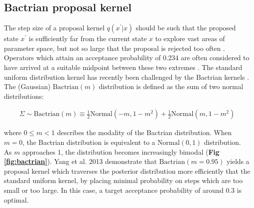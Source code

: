 \documentclass[10pt,letterpaper]{article}
\begin{document}
\clearpage
\subsection*{Bactrian proposal kernel} \label{sect:randomwalks}



The step size of a proposal kernel $q(x^\prime|x)$ should be such that the proposed state $x^\prime$ is sufficiently far from the current state $x$ to explore vast areas of parameter space, but not so large that the proposal is rejected too often \cite{roberts1997weak}. 
Operators which attain an acceptance probability of 0.234 are often considered to have arrived at a suitable midpoint between these two extremes \cite{bouckaert2019beast, roberts1997weak}.
The standard uniform distribution kernel has recently been challenged by the Bactrian kernels \cite{yang2013searching, thawornwattana2018designing}.
The (Gaussian) $\text{Bactrian}(m)$ distribution is defined as the sum of two normal distributions:


\begin{align}
	\Sigma \sim \text{Bactrian}(m) \equiv \frac{1}{2}\text{Normal}(-m, 1-m^2) + \frac{1}{2}\text{Normal}(m, 1-m^2)
\end{align}


\noindent
where $0 \leq m < 1$ describes the modality of the Bactrian distribution. When $m=0$, the Bactrian distribution is equivalent to a $\text{Normal}(0, 1)$ distribution. 
As $m$ approaches 1, the distribution becomes increasingly bimodal (\textbf{Fig \ref{fig:bactrian}}). 
Yang et al. 2013 \cite{yang2013searching} demonstrate that $\text{Bactrian}(m=0.95)$ yields a proposal kernel which traverses the posterior distribution more efficiently that the standard uniform kernel, by placing minimal probability on steps which are too small or too large.
In this case, a target acceptance probability of around 0.3 is optimal.
\end{document}
